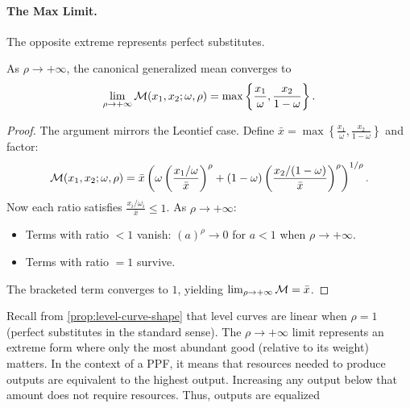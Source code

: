 \paragraph{The Max Limit.}

The opposite extreme represents perfect substitutes.

\begin{proposition}
\label{prop:max-limit}
As $\rho \to +\infty$, the canonical generalized mean converges to
\begin{equation}
\label{eq:max-limit}
\lim_{\rho \to +\infty} \mathcal{M}(x_1, x_2; \omega, \rho) = \max\left\{ \frac{x_1}{\omega}, \frac{x_2}{1-\omega} \right\}.
\end{equation}
\end{proposition}

\begin{proof}
The argument mirrors the Leontief case. Define $\bar{x} = \max\left\{ \frac{x_1}{\omega}, \frac{x_2}{1-\omega} \right\}$ and factor:
\[
\mathcal{M}(x_1, x_2; \omega, \rho) = \bar{x} \left( \omega \left( \frac{x_1/\omega}{\bar{x}} \right)^\rho + (1-\omega) \left( \frac{x_2/(1-\omega)}{\bar{x}} \right)^\rho \right)^{1/\rho}.
\]
Now each ratio satisfies $\frac{x_i/\omega_i}{\bar{x}} \leq 1$. As $\rho \to +\infty$:
\begin{itemize}[leftmargin=1.5em]
    \item Terms with ratio $< 1$ vanish: $(a)^\rho \to 0$ for $a < 1$ when $\rho \to +\infty$.
    \item Terms with ratio $= 1$ survive.
\end{itemize}
The bracketed term converges to $1$, yielding $\lim_{\rho \to +\infty} \mathcal{M} = \bar{x}$.
\end{proof}

\begin{remark}
Recall from \cref{prop:level-curve-shape} that level curves are linear when $\rho = 1$ (perfect substitutes in the standard sense). The $\rho \to +\infty$ limit represents an extreme form where only the most abundant good (relative to its weight) matters. In the context of a PPF, it means that resources needed to produce outputs are equivalent to the highest output. Increasing any output below that amount does not require resources. Thus, outputs are equalized
\end{remark}

